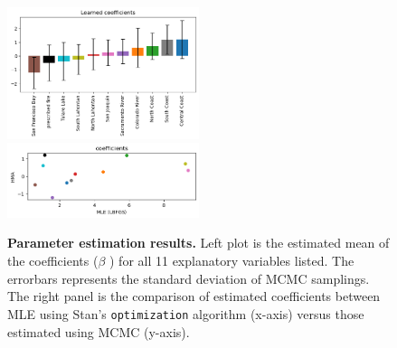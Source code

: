 \documentclass{article}
\begin{document}
\begin{figure}[!h]
  \centering
\includegraphics[width=0.5\textwidth]{latex_template/figs/betas.png}
\includegraphics[width=0.5\textwidth]{latex_template/figs/hmc_mle.png}
\caption{\textbf{Parameter estimation results.} Left plot is the estimated mean of the coefficients ($\beta$ ) for all 11 explanatory variables listed. The errorbars represents the standard deviation of MCMC samplings. The right panel is the comparison of estimated coefficients between MLE using Stan's \texttt{optimization} algorithm (x-axis) versus those estimated using MCMC (y-axis). }
\label{fig:data}
\end{figure}
\end{document}
